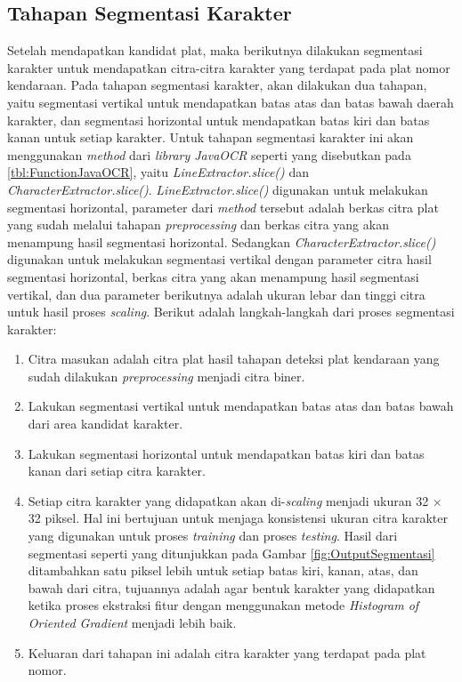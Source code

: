 \subsection{Tahapan Segmentasi Karakter}
\noindent Setelah mendapatkan kandidat plat, maka berikutnya dilakukan segmentasi karakter untuk mendapatkan citra-citra karakter yang terdapat pada plat nomor kendaraan. Pada tahapan segmentasi karakter, akan dilakukan dua tahapan, yaitu segmentasi vertikal untuk mendapatkan batas atas dan batas bawah daerah karakter, dan segmentasi horizontal untuk mendapatkan batas kiri dan batas kanan untuk setiap karakter. Untuk tahapan segmentasi karakter ini akan menggunakan \textit{method} dari \textit{library JavaOCR} seperti yang disebutkan pada \ref{tbl:FunctionJavaOCR}, yaitu \textit{LineExtractor.slice()} dan \textit{CharacterExtractor.slice()}. \textit{LineExtractor.slice()} digunakan untuk melakukan segmentasi horizontal, parameter dari \textit{method} tersebut adalah berkas citra plat yang sudah melalui tahapan \textit{preprocessing} dan berkas citra yang akan menampung hasil segmentasi horizontal. Sedangkan \textit{CharacterExtractor.slice()} digunakan untuk melakukan segmentasi vertikal dengan parameter citra hasil segmentasi horizontal, berkas citra yang akan menampung hasil segmentasi vertikal, dan dua parameter berikutnya adalah ukuran lebar dan tinggi citra untuk hasil proses \textit{scaling}. Berikut adalah langkah-langkah dari proses segmentasi karakter:
\begin{enumerate}
\item Citra masukan adalah citra plat hasil tahapan deteksi plat kendaraan yang sudah dilakukan \textit{preprocessing} menjadi citra biner.
\item Lakukan segmentasi vertikal untuk mendapatkan batas atas dan batas bawah dari area kandidat karakter.
\item Lakukan segmentasi horizontal untuk mendapatkan batas kiri dan batas kanan dari setiap citra karakter.
\item Setiap citra karakter yang didapatkan akan di-\textit{scaling} menjadi ukuran 32 $\times$ 32 piksel. Hal ini bertujuan untuk menjaga konsistensi ukuran citra karakter yang digunakan untuk proses \textit{training} dan proses \textit{testing}. Hasil dari segmentasi seperti yang ditunjukkan pada Gambar \ref{fig:OutputSegmentasi} ditambahkan satu piksel lebih untuk setiap batas kiri, kanan, atas, dan bawah dari citra, tujuannya adalah agar bentuk karakter yang didapatkan ketika proses ekstraksi fitur dengan menggunakan metode \textit{Histogram of Oriented Gradient} menjadi lebih baik.
\item Keluaran dari tahapan ini adalah citra karakter yang terdapat pada plat nomor.
\end{enumerate}

